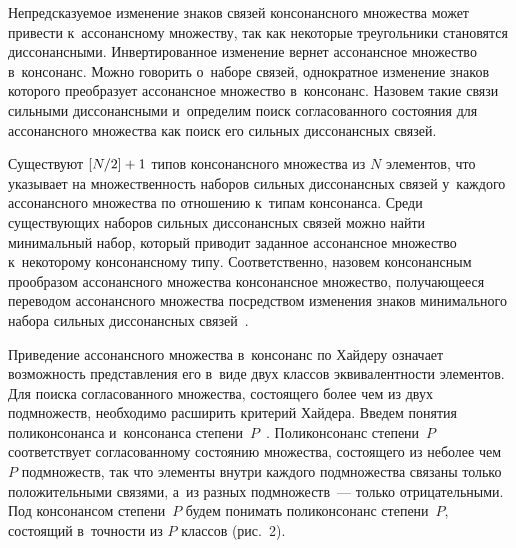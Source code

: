 \begin{multicols}{2}
     Непредсказуемое изменение знаков связей консонансного множества 
может привести к~ассонансному множеству, так как некоторые треугольники\linebreak 
становятся диссонансными. Инвертированное изменение вернет ассонансное 
множество в~консонанс. Можно говорить о~наборе связей, однократное 
изменение знаков которого преобразует \mbox{ассонансное} множество в~консонанс. 
Назовем такие связи сильными диссонансными и~определим поиск 
со\-гла\-со\-ван\-но\-го со\-сто\-яния для ассонансного множества как поиск его 
силь\-ных диссонансных связей.
     
     Существуют $[N/2]\hm+1$ типов консонансного множества из $N$ 
элементов, что указывает на множественность наборов сильных 
диссонансных связей у~каждого ассонансного множества по отношению 
к~типам консонанса. Среди су\-ще\-ст\-ву\-ющих наборов сильных диссонансных 
связей можно найти минимальный набор, который приводит заданное 
ассонансное множество к~некоторому консонансному типу. Соответственно, 
назовем консонансным прообразом ассонансного множества консонансное 
множество, по\-лу\-ча\-юще\-еся переводом ассонансного множества по\-средст\-вом 
изменения знаков минимального набора сильных диссонансных 
связей~\cite{5-dul}.
     
     Приведение ассонансного множества в~консонанс по Хай\-де\-ру означает 
воз\-мож\-ность пред\-став\-ле\-ния его в~виде двух классов эк\-ви\-ва\-лент\-ности 
элементов. Для поиска согласованного множества, со\-сто\-яще\-го более чем из 
двух подмножеств, необходимо расширить критерий Хай\-де\-ра. Введем 
понятия поликонсонанса и~консонанса степени~$P$~\cite{5-dul}. 
Поликонсонанс степени~$P$ соответствует со\-гла\-со\-ван\-но\-му со\-сто\-янию 
множества, со\-сто\-яще\-го из не\linebreak более чем $P$ подмножеств, так что элементы 
внут\-ри каждого подмножества связаны только положительными связями, 
а~из разных подмножеств~--- только отрицательными. Под консонансом 
\mbox{степени}~$P$ будем понимать поликонсонанс степени~$P$, со\-сто\-ящий 
в~точ\-ности из $P$ классов (рис.~2).
     

\begin{figure*} %
\vspace*{1pt}
\begin{center}
   \mbox{%
\epsfxsize=115.348mm
}
\end{center}
\vspace*{-9pt}
\end{figure*}
     

\end{multicols}
